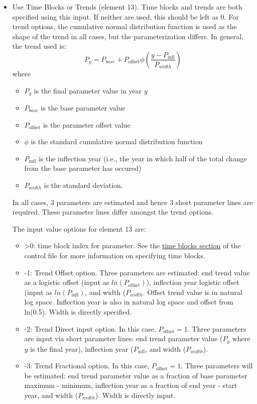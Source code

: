 \begin{itemize}
\item Use Time Blocks or Trends (element 13). Time blocks and trends are both specified using this input. If neither are used, this should be left as 0. For trend options, the cumulative normal distribution function is used as the shape of the trend in all cases, but the parameterization differs. In general, the trend used is: 
    \begin{equation}
	    P_y = P_{base} + P_{\text{offset}}\phi(\frac{y - P_{\text{infl}}}{P_{width}})
	\end{equation}
	where
	\begin{itemize} 
	    \item $P_y$ is the final parameter value in year $y$
		\item $P_{base}$ is the base parameter value
		\item $P_{\text{offset}}$ is the parameter offset value
		\item $\phi$ is the standard cumulative normal distribution function
		\item $P_{\text{infl}}$ is the inflection year (i.e., the year in which half of the total change from the base parameter has occured)
		\item $P_{width}$ is the standard deviation.
	\end{itemize}
In all cases, 3 parameters are estimated and hence 3 short parameter lines are required. These parameter lines differ amongst the trend options.

The input value options for element 13 are:
	\begin{itemize}
		\item >0: time block index for parameter. See the \hyperlink{timeblocks}{time blocks section} of the control file for more information on specifying time blocks.
		\item -1: Trend Offset option. Three parameters are estimated: end trend value as a logistic offset (input as $ln(P_{\text{offset}})$), inflection year logistic offset (input as $ln(P_{\text{infl}})$, and width ($P_{width}$. Offset trend value is in natural log space. Inflection year is also in natural log space and offset from ln(0.5). Width is directly specified.
		\item -2: Trend Direct input option. In this case, $P_{\text{offset}} = 1$. Three parameters are input via short parameter lines: end trend parameter value ($P_y$ where $y$ is the final year), inflection year ($P_{\text{infl}}$, and width ($P_{width}$). 
		\item -3: Trend Fractional option. In this case, $P_{\text{offset}} = 1$. Three parameters will be estimated: end trend parameter value as a fraction of base parameter maximum - minimum, inflection year as a fraction of end year - start year, and width ($P_{width}$). Width is directly input.
	\end{itemize}
	

\end{itemize}
